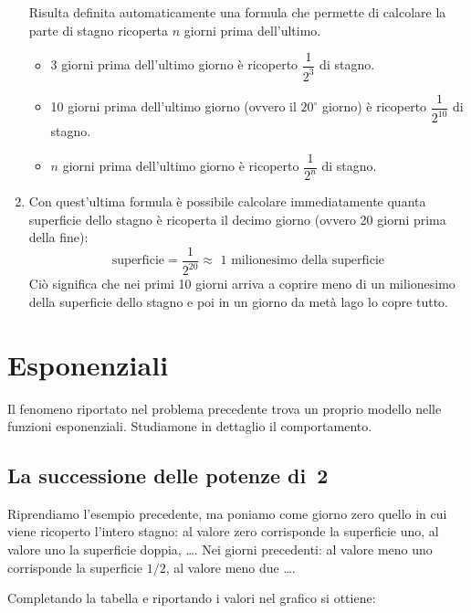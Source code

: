 \begin{enumerate}
Risulta definita automaticamente una formula che permette di calcolare la 
parte di stagno ricoperta
\(n\) giorni prima dell'ultimo.
\begin{itemize}
 \item 3 giorni prima dell'ultimo giorno è ricoperto \(\dfrac{1}{2^3}\) di 
stagno.
 \item 10 giorni prima dell'ultimo giorno (ovvero il \(20^\circ\) giorno) è 
ricoperto \(\dfrac{1}{2^{10}}\) di stagno.
 \item \(n\) giorni prima dell'ultimo giorno è ricoperto 
\(\dfrac{1}{2^{n}}\) di stagno.
\end{itemize}

\item Con quest'ultima formula è possibile calcolare immediatamente quanta 
superficie dello stagno è ricoperta il decimo giorno (ovvero 20 giorni 
prima della fine):
\[\text{superficie} = \dfrac{1}{2^{20}} \approx 
\text{ 1 milionesimo della superficie}\]
Ciò significa che nei primi 10 giorni arriva a coprire meno di un 
milionesimo 
della superficie dello stagno e poi in un giorno da metà lago lo copre 
tutto.
\end{enumerate}

\section{Esponenziali}
\label{sec:esplog_esponenziali}

Il fenomeno riportato nel problema precedente trova un proprio modello 
nelle 
funzioni esponenziali. Studiamone in dettaglio il comportamento.

\subsection{La successione delle potenze di~2}
\label{subsec:esplog_succpotdue}

Riprendiamo l'esempio precedente, ma poniamo come giorno zero quello in cui 
viene 
ricoperto l'intero stagno: al valore zero corrisponde la superficie uno, al 
valore uno la superficie doppia, \dots. Nei giorni precedenti: al valore 
meno uno 
corrisponde la superficie \(1/2\), al valore meno due \dots.

Completando la tabella e riportando i valori nel grafico si ottiene:

